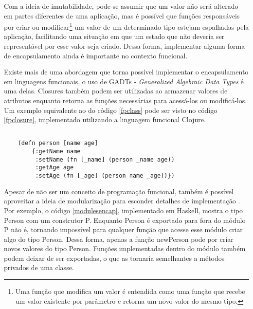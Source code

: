 Com a ideia de imutabilidade, pode-se 
assumir que um valor não será alterado em partes 
diferentes de uma aplicação, mas é possível 
que funções responsáveis por criar ou modificar\footnote{
    Uma função que modifica um valor é entendida 
    como uma função que recebe um valor existente 
    por parâmetro e retorna um novo valor do mesmo 
    tipo.
} 
um valor de um determinado tipo estejam 
espalhadas pela aplicação, facilitando uma 
situação em que um estado que não deveria ser 
representável por esse valor seja criado. 
Dessa forma, implementar alguma forma de 
encapsulamento ainda é importante no 
contexto funcional.

Existe mais de uma abordagem que torna 
possível implementar o encapsulamento em 
linguagens funcionais, o uso de GADTs - 
\textit{Generalized Algebraic 
Data Types}\cite{existentialhaskell} é uma 
delas. Closures também podem 
ser utilizadas ao armazenar valores de 
atributos enquanto retorna as funções 
necessárias para acessá-los ou modificá-los. 
Um exemplo equivalente ao do código \ref{fpclass} 
pode ser visto no código \ref{fpclosure}, 
implementado utilizando a linguagem funcional Clojure. \cite{classlessjs}

\begin{lstlisting}[caption={Representação de uma classe com closures},label=fpclosure]
    
    (defn person [name age]
        {:getName name
         :setName (fn [_name] (person _name age))
         :getAge age
         :setAge (fn [_age] (person name _age))})

\end{lstlisting}

Apesar de não ser um conceito de programação 
funcional, também é possível aproveitar a ideia 
de modularização para esconder detalhes de 
implementação \cite{mlmodules}. Por exemplo, o 
código \ref{modulesencap}, implementado em 
Haskell, mostra o tipo Person com um construtor 
P. Enquanto Person é exportado para fora do 
módulo P não é, tornando impossível para qualquer 
função que acesse esse módulo criar algo do tipo 
Person. Dessa forma, apenas a função newPerson 
pode por criar novos valores do tipo 
Person. Funções implementadas dentro do módulo 
também podem deixar de ser exportadas, o que 
as tornaria semelhantes a métodos privados 
de uma classe.

